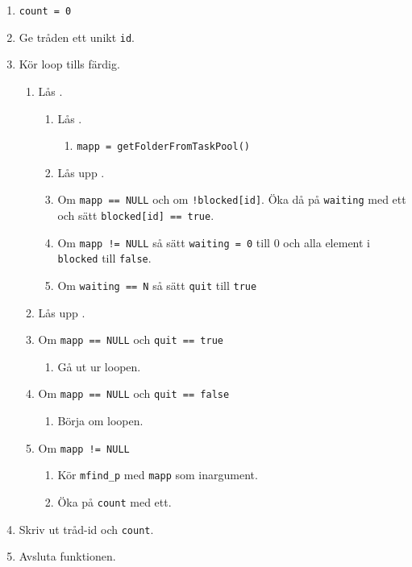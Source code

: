 \begin{enumerate}
\item \texttt{count = 0}
\item	Ge tråden ett unikt \texttt{id}.
\item	Kör loop tills färdig.
	\begin{enumerate}
	\item	Lås \getTaskMutex.
		\begin{enumerate}
		\item	Lås \accessTaskPoolMutex.
			\begin{enumerate}
			\item	\texttt{mapp = getFolderFromTaskPool()}
			\end{enumerate}
		\item	Lås upp \accessTaskPoolMutex.
		\item 	Om \texttt{mapp == NULL} och om \texttt{!blocked[id]}. Öka då på \texttt{waiting} med ett och sätt \texttt{blocked[id] == true}.
		\item	Om \texttt{mapp != NULL} så sätt \texttt{waiting = 0} till 0 och alla element i \texttt{blocked} till \texttt{false}.
		\item 	Om \texttt{waiting == N} så sätt \texttt{quit} till \texttt{true}
		\end{enumerate}
	\item	Lås upp \getTaskMutex.
	\item	Om \texttt{mapp == NULL} och \texttt{quit == true}
		\begin{enumerate}
		\item	Gå ut ur loopen.
		\end{enumerate}
	\item	Om \texttt{mapp == NULL} och \texttt{quit == false}
		\begin{enumerate}
		\item	Börja om loopen.
		\end{enumerate}
	\item	Om \texttt{mapp != NULL}
		\begin{enumerate}
		\item	Kör \texttt{mfind\_p} med \texttt{mapp} som inargument.
		\item	Öka på \texttt{count} med ett.
		\end{enumerate}	
	\end{enumerate}
\item	Skriv ut tråd-id och \texttt{count}.
\item	Avsluta funktionen.
\end{enumerate}


